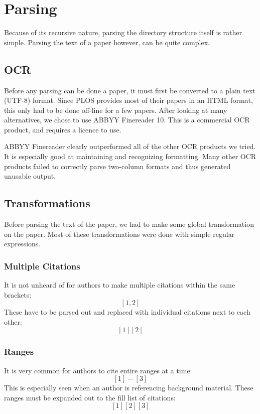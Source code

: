 \documentclass[10pt, conference, compsocconf]{IEEEtran}
\begin{document}
\section{Parsing}\label{sec:parsing}
Because of its recursive nature, parsing the directory structure itself is rather simple.
Parsing the text of a paper however, can be quite complex.

\subsection{OCR}
Before any parsing can be done a paper, it must first be converted to a plain text (UTF-8) format.
Since PLOS provides most of their papers in an HTML format, this only had to be done off-line for a few
papers. After looking at many alternatives, we chose to use ABBYY Finereader 10\cite{abbyy}. This
is a commercial OCR product, and requires a licence to use.

ABBYY Finereader clearly outperformed all of the other OCR products we tried. It is especially
good at maintaining and recognizing formatting. Many other OCR products failed to correctly parse
two-column formats and thus generated unusable output.

\subsection{Transformations}\label{sec:transforms}
Before parsing the text of the paper, we had to make some global transformation on the paper.
Most of these transformations were done with simple regular expressions.

\subsubsection{Multiple Citations}
It is not unheard of for authors to make multiple citations within the same brackets: $$[1, 2]$$
These have to be parsed out and replaced with individual citations next to each other: $$[1][2]$$

\subsubsection{Ranges}
It is very common for authors to cite entire ranges at a time: $$[1] - [3]$$
This is especially seen when an author is referencing background material. These ranges must be expanded out to
the fill list of citations: $$[1][2][3]$$
\end{document}
